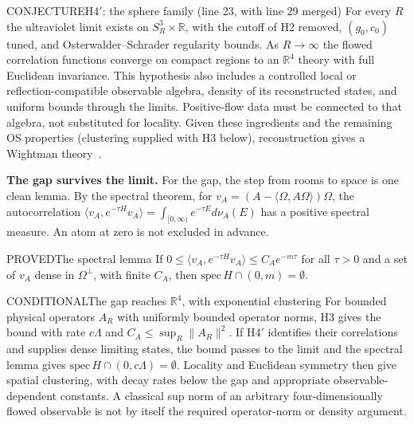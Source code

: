 \begin{claim}{CONJECTURE}{H4$'$: the sphere family (line 23, with line 29 merged)}\label{b:h4}
For every $R$ the ultraviolet limit exists on $S^3_R\times\mathbb R$, with the cutoff of H2 removed, $(g_0,c_0)$ tuned,
and Osterwalder--Schrader regularity bounds. As $R\to\infty$ the flowed correlation functions converge on compact regions
to an $\mathbb R^4$ theory with full Euclidean invariance. This hypothesis also includes a controlled local or
reflection-compatible observable algebra, density of its reconstructed states, and uniform bounds through the limits.
Positive-flow data must be connected to that algebra, not substituted for locality. Given these ingredients and
the remaining OS properties (clustering supplied with H3 below), reconstruction gives a Wightman theory~\cite{OS73,OS75,GlimmJaffe}.
\end{claim}

\textbf{The gap survives the limit.} For the gap, the step from rooms to space is one clean lemma. By the spectral
theorem, for $v_A=(A-\langle\Omega,A\Omega\rangle)\Omega$, the autocorrelation
$\langle v_A,e^{-\tau H}v_A\rangle=\int_{[0,\infty)}e^{-\tau E}d\nu_A(E)$ has a positive spectral measure.
An atom at zero is not excluded in advance.

\begin{claim}{PROVED}{The spectral lemma}\label{b:lemma}
If $0\le\langle v_A,e^{-\tau H}v_A\rangle\le C_Ae^{-m\tau}$ for all $\tau>0$ and a set of $v_A$ dense in
$\Omega^\perp$, with finite $C_A$, then
$\mathrm{spec}\,H\cap(0,m)=\emptyset$.
\evidence{Weight of $\nu_A$ on $[0,m)$ would decay more slowly than $e^{-m\tau}$; density does the rest~\cite{ReedSimonIV}.}
\end{claim}

\begin{claim}{CONDITIONAL}{The gap reaches $\mathbb R^4$, with exponential clustering}\label{b:deduce}
For bounded physical operators $A_R$ with uniformly bounded operator norms, H3 gives the bound with rate
$c\Lambda$ and $C_A\le\sup_R\|A_R\|^2$. If H4$'$ identifies their correlations and supplies dense limiting states,
the bound passes to the limit and the spectral lemma gives $\mathrm{spec}\,H\cap(0,c\Lambda)=\emptyset$.
Locality and Euclidean symmetry then give spatial clustering, with decay rates below the gap and appropriate
observable-dependent constants. A classical sup norm of an arbitrary four-dimensionally flowed observable is not
by itself the required operator-norm or density argument.
\end{claim}

